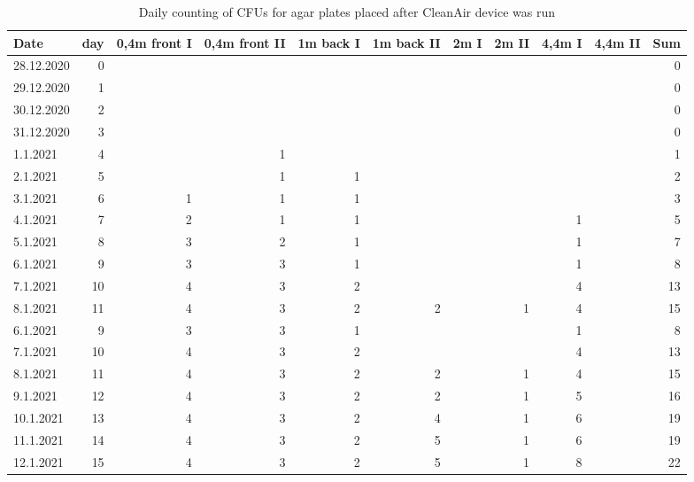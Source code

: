 \documentclass[hyperref]{labbook}
\begin{document}
\begin{table}[H]
\tiny
\begin{tabular}{|l r | rrrrrrrrr|}\hline
Date      &day&0,4m front I&0,4m front II&1m back I&1m back II&2m I&2m II&4,4m I&4,4m II&Sum\\\hline
28.12.2020&0  &            &             &           &            &    &     &      &       &0  \\
29.12.2020&1  &            &             &           &            &    &     &      &       &0  \\
30.12.2020&2  &            &             &           &            &    &     &      &       &0  \\
31.12.2020&3  &            &             &           &            &    &     &      &       &0  \\
1.1.2021  &4  &            &1            &           &            &    &     &      &       &1  \\
2.1.2021  &5  &            &1            &1          &            &    &     &      &       &2  \\
3.1.2021  &6  &1           &1            &1          &            &    &     &      &       &3  \\
4.1.2021  &7  &2           &1            &1          &            &    &     &1     &       &5  \\
5.1.2021  &8  &3           &2            &1          &            &    &     &1     &       &7  \\
6.1.2021  &9  &3           &3            &1          &            &    &     &1     &       &8  \\
7.1.2021  &10 &4           &3            &2          &            &    &     &4     &       &13 \\
8.1.2021  &11 &4           &3            &2          &2           &    &1    &4     &       &15 \\
6.1.2021  &9  &3           &3            &1          &            &    &     &1     &       &8  \\
7.1.2021  &10 &4           &3            &2          &            &    &     &4     &       &13 \\
8.1.2021  &11 &4           &3            &2          &2           &    &1    &4     &       &15 \\
9.1.2021  &12 &4           &3            &2          &2           &    &1    &5     &       &16 \\
10.1.2021 &13 &4           &3            &2          &4           &    &1    &6     &       &19 \\
11.1.2021 &14 &4           &3            &2          &5           &    &1    &6     &       &19 \\
12.1.2021 &15 &4           &3            &2          &5           &    &1    &8     &       &22 \\\hline
\end{tabular}
\caption{Daily counting of CFUs for agar plates placed after CleanAir device was run}
\end{table}
\end{document}
